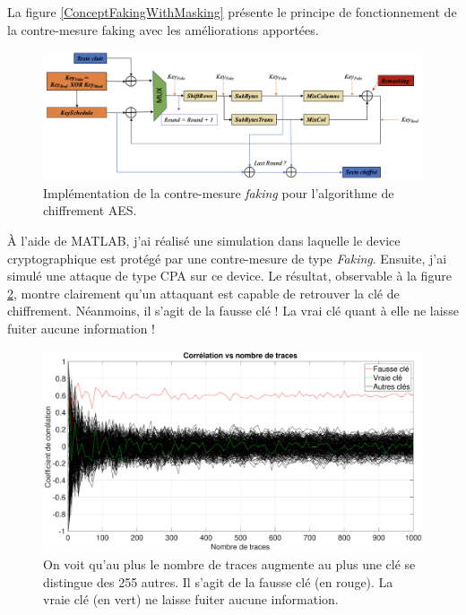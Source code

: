 \documentclass[oneside]{book}
\begin{document}
La figure \ref{ConceptFakingWithMasking} présente le principe de fonctionnement de la contre-mesure faking avec les améliorations apportées.
\begin{figure}[htbp]
    \hspace{-1.4cm}
    \includegraphics[scale=0.52]{image/ConceptFaking}
    \caption{Implémentation de la contre-mesure \textit{faking} pour l'algorithme de chiffrement AES.}
    \label{fig:ConceptFakingWithMasking} 
\end{figure}


À l'aide de MATLAB, j'ai réalisé une simulation dans laquelle le device cryptographique est protégé par une contre-mesure de type \textit{Faking}. Ensuite, j'ai simulé une attaque de type CPA sur ce device. Le résultat, observable à la figure \ref{fig:faking}, montre clairement qu'un attaquant est capable de retrouver la clé de chiffrement. Néanmoins, il s'agit de la fausse clé ! La vrai clé quant à elle ne laisse fuiter aucune information !
\begin{figure}[htbp]
    \centering
    \hspace{-1 cm}
    \includegraphics[scale=0.24]{image/faking}
    \caption{On voit qu'au plus le nombre de traces augmente au plus une clé se distingue des 255 autres. Il s'agit de la fausse clé (en rouge). La vraie clé (en vert) ne laisse fuiter aucune information.}
    \label{fig:faking} 
\end{figure}
\end{document}
